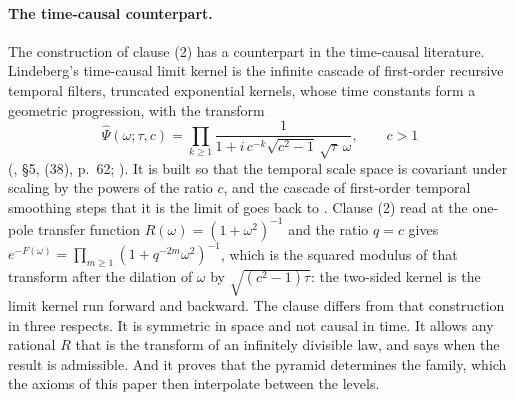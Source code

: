 \paragraph{The time-causal counterpart.} The construction of clause (2) has a counterpart in
the time-causal literature. Lindeberg's time-causal limit kernel is the infinite cascade of
first-order recursive temporal filters, truncated exponential kernels, whose time constants
form a geometric progression, with the transform
\[
  \hat\Psi(\omega;\tau,c) = \prod_{k \ge 1}\frac{1}{1 + i\,c^{-k}\sqrt{c^2-1}\,\sqrt\tau\,\omega},
  \qquad c > 1
\]
(, \S 5, (38), p.~62; ). It is built so
that the temporal scale space is covariant under scaling by the powers of the ratio $c$, and
the cascade of first-order temporal smoothing steps that it is the limit of goes back to
. Clause (2) read at the one-pole transfer function
$R(\omega) = (1+\omega^2)^{-1}$ and the ratio $q = c$ gives
$e^{-F(\omega)} = \prod_{m \ge 1}(1 + q^{-2m}\omega^2)^{-1}$, which is the squared modulus of
that transform after the dilation of $\omega$ by $\sqrt{(c^2-1)\tau}$: the two-sided kernel is
the limit kernel run forward and backward. The clause differs from that construction in three
respects. It is symmetric in space and not causal in time. It allows any rational $R$ that is
the transform of an infinitely divisible law, and says when the result is admissible. And it
proves that the pyramid determines the family, which the axioms of this paper then interpolate
between the levels.

